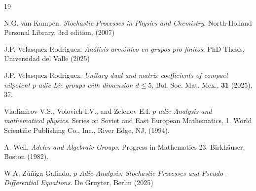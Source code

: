 \documentclass[a4paper,draft]{ZbRad}
\theoremstyle{plain}
\theoremstyle{definition}
\numberwithin{equation}{section}
\renewcommand{\le}{\leqslant}\renewcommand{\leq}{\leqslant}
\begin{document}
\begin{thebibliography}{19}

N.G. van Kampen. \emph{Stochastic Processes in Physics and Chemistry}. North-Holland Personal Library, 3rd edition, (2007)

J.P. Velasquez-Rodriguez.
\emph{Análisis armónico en grupos pro-finitos},  PhD Thesis,
Universidad del Valle (2025)

J.P. Velasquez-Rodriguez.
\emph{Unitary dual and matrix coefficients of compact nilpotent
$p$-adic Lie groups with dimension $d \le 5$},
Bol. Soc. Mat. Mex., \textbf{31} (2025), 37.

Vladimirov V.S., Volovich I.V., and Zelenov E.I. \emph{$p$-adic Analysis and
mathematical physics}. Series on Soviet and East European Mathematics,
1. World Scientific Publishing Co., Inc., River Edge, NJ, (1994).

A. Weil, \emph{Adeles and Algebraic Groups}. Progress in Mathematics 23.
Birkhäuser, Boston (1982).

W.A. Zúñiga-Galindo, \emph{$p$-Adic Analysis: Stochastic Processes and Pseudo-
Diﬀerential Equations}. De Gruyter, Berlin (2025)
\end{thebibliography}
\end{document}
